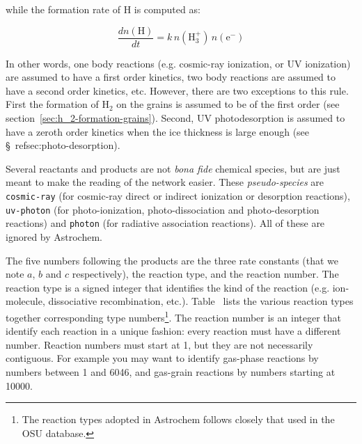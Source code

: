 \documentclass[a4paper,12pt]{article}
\newcommand{\conc}[1]{n(\mathrm{#1})}
\begin{document}
\noindent
while the formation rate of H is computed as:

\begin{equation}
  \frac{d \conc{H}}{dt} = k \, \conc{H_{3}^{+}} \, \conc{e^{-}}
\end{equation}

\noindent
In other words, one body reactions (e.g. cosmic-ray ionization, or UV
ionization) are assumed to have a first order kinetics, two body
reactions are assumed to have a second order kinetics, etc. However,
there are two exceptions to this rule. First the formation of H$_{2}$
on the grains is assumed to be of the first order (see
section~\ref{sec:h_2-formation-grains}). Second, UV photodesorption is
assumed to have a zeroth order kinetics when the ice thickness is
large enough (see \S~ref{sec:photo-desorption}).

Several reactants and products are not \emph{bona fide} chemical
species, but are just meant to make the reading of the network
easier. These \emph{pseudo-species} are \verb=cosmic-ray= (for
cosmic-ray direct or indirect ionization or desorption reactions),
\verb=uv-photon= (for photo-ionization, photo-dissociation and
photo-desorption reactions) and \verb=photon= (for radiative
association reactions). All of these are ignored by Astrochem.

The five numbers following the products are the three rate constants
(that we note $a$, $b$ and $c$ respectively), the reaction type, and
the reaction number. The reaction type is a signed integer that
identifies the kind of the reaction (e.g. ion-molecule, dissociative
recombination, etc.). Table~\label{tab:react-typea-numb} lists the
various reaction types together corresponding type
numbers\footnote{The reaction types adopted in Astrochem follows
  closely that used in the OSU database.}. The reaction number is an
integer that identify each reaction in a unique fashion: every
reaction must have a different number. Reaction numbers must start at
1, but they are not necessarily contiguous. For example you may want
to identify gas-phase reactions by numbers between 1 and 6046, and
gas-grain reactions by numbers starting at 10000.
\end{document}
